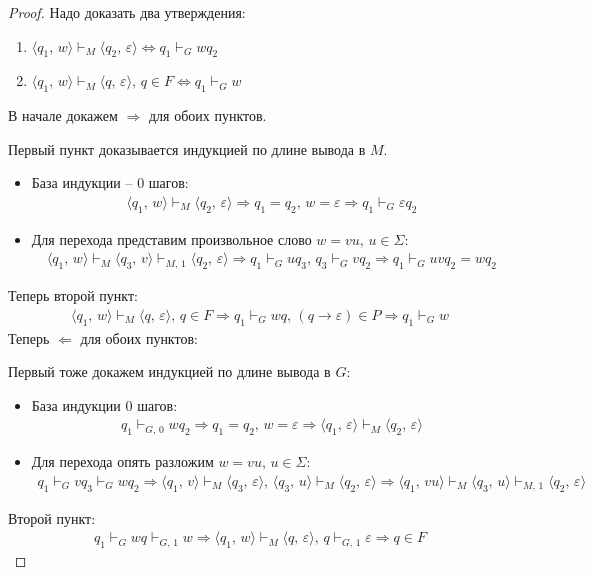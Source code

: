 \documentclass[a4paper,12pt]{article}
\theoremstyle{plain}
\theoremstyle{definition}
\theoremstyle{remark}
\begin{document}
\begin{proof}
	Надо доказать два утверждения:
	\begin{enumerate}
		\item $\langle q_1,\, w\rangle \vdash_M \langle q_2,\, \varepsilon\rangle \Leftrightarrow q_1 \vdash_G wq_2$
		\item $\langle q_1,\, w\rangle \vdash_M \langle q,\, \varepsilon\rangle,\, q \in F \Leftrightarrow q_1 \vdash_G w$
	\end{enumerate}
	В начале докажем $\Rightarrow$ для обоих пунктов.

	Первый пункт доказывается индукцией по длине вывода в $M$.
	\begin{itemize}
		\item База индукции -- 0 шагов:
		      \begin{align*}
			      \langle q_1,\, w\rangle \vdash_M \langle q_2,\, \varepsilon\rangle \Rightarrow q_1 = q_2,\, w = \varepsilon \Rightarrow q_1 \vdash_G \varepsilon q_2
		      \end{align*}
		\item Для перехода представим произвольное слово $w = vu,\, u \in \Sigma$:
		      \begin{align*}
			      \langle q_1,\, w\rangle \vdash_M \langle q_3,\, v\rangle \vdash_{M,\, 1} \langle q_2,\, \varepsilon\rangle \Rightarrow q_1 \vdash_G uq_3,\, q_3 \vdash_G vq_2 \Rightarrow q_1 \vdash_G uvq_2 = wq_2
		      \end{align*}
	\end{itemize}
	Теперь второй пункт:
	\begin{align*}
		\langle q_1,\, w \rangle \vdash_M \langle q,\, \varepsilon\rangle,\, q \in F \Rightarrow q_1 \vdash_G wq,\, (q \to \varepsilon) \in P \Rightarrow q_1 \vdash_G w
	\end{align*}
	Теперь $\Leftarrow$ для обоих пунктов:

	Первый тоже докажем индукцией по длине вывода в $G$:
	\begin{itemize}
		\item База индукции 0 шагов:
		      \begin{align*}
			      q_1 \vdash_{G,\, 0} wq_2 \Rightarrow q_1 = q_2,\, w = \varepsilon \Rightarrow \langle q_1,\, \varepsilon\rangle \vdash_M \langle q_2,\, \varepsilon\rangle
		      \end{align*}
		\item Для перехода опять разложим $w = vu,\, u \in \Sigma$:
		      \begin{align*}
			      q_1 \vdash_G vq_3 \vdash_G wq_2 \Rightarrow \langle q_1,\, v\rangle \vdash_M \langle q_3,\, \varepsilon\rangle,\, \langle q_3,\, u\rangle \vdash_M \langle q_2,\, \varepsilon\rangle \Rightarrow \langle q_1,\, vu\rangle \vdash_M \langle q_3,\, u\rangle \vdash_{M,\, 1} \langle q_2,\, \varepsilon\rangle
		      \end{align*}
	\end{itemize}
	Второй пункт:
	\begin{align*}
		q_1 \vdash_G wq \vdash_{G,\, 1} w \Rightarrow \langle q_1,\, w\rangle \vdash_M \langle q,\, \varepsilon\rangle,\, q \vdash_{G,\, 1} \varepsilon \Rightarrow q \in F
	\end{align*}


\end{proof}
\end{document}
